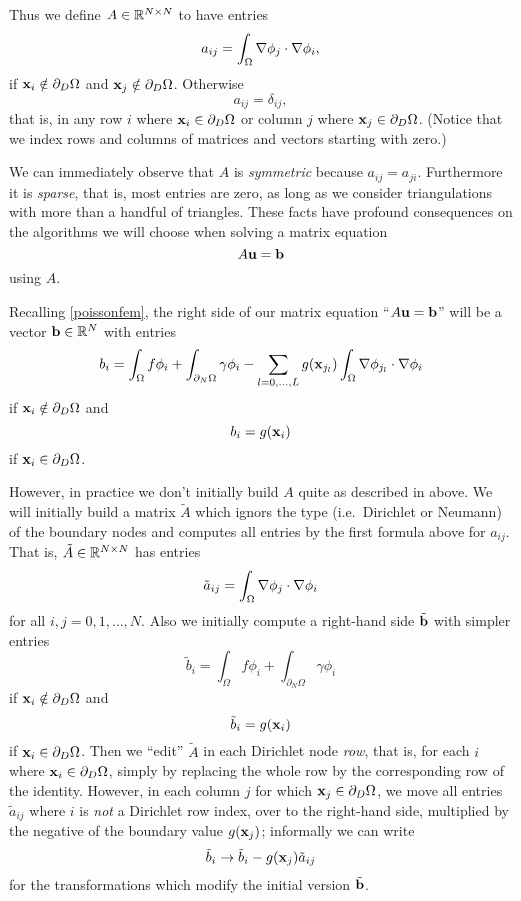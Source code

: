 Thus we define $A \in \mathbb{R}^{N\times N}$ to have entries
\begin{equation*}
a_{ij} = \int_\Omega \nabla \phi_j \cdot \nabla \phi_i,
\end{equation*}
if $\mathbf{x}_i \notin \partial_D \Omega$ and $\mathbf{x}_j \notin \partial_D \Omega$.  Otherwise
\begin{equation*}
a_{ij} = \delta_{ij},
\end{equation*}
that is, in any row $i$ where $\mathbf{x}_i \in \partial_D \Omega$ or column $j$ where $\mathbf{x}_j \in \partial_D \Omega$.  (Notice that we index rows and columns of matrices and vectors starting with zero.)

We can immediately observe that $A$ is \emph{symmetric} because $a_{ij}=a_{ji}$.  Furthermore it is \emph{sparse}, that is, most entries are zero, as long as we consider triangulations with more than a handful of triangles.  These facts have profound consequences on the algorithms we will choose when solving a matrix equation
\begin{equation}
A \mathbf{u} = \mathbf{b} \label{poissonmatrix}
\end{equation}
using $A$.

Recalling \eqref{poissonfem}, the right side of our matrix equation ``$A \mathbf{u} = \mathbf{b}$'' will be a vector $\mathbf{b}\in\mathbb{R}^N$ with entries
    $$b_i = \int_\Omega f \phi_i + \int_{\partial_N\Omega} \gamma \phi_i - \sum_{l=0,\dots,L} g(\mathbf{x}_{j_l})  \int_\Omega \nabla \phi_{j_l} \cdot \nabla \phi_i$$
if $\mathbf{x}_i \notin \partial_D \Omega$ and
    $$b_i = g(\mathbf{x}_{i})$$
if $\mathbf{x}_i \in \partial_D \Omega$.

However, in practice we don't initially build $A$ quite as described in above.  We will initially build a matrix $\tilde A$ which ignors the type (i.e.~Dirichlet or Neumann) of the boundary nodes and computes all entries by the first formula above for $a_{ij}$.  That is, $\tilde A \in \mathbb{R}^{N\times N}$ has entries
\begin{equation*}
\tilde a_{ij} = \int_\Omega \nabla \phi_j \cdot \nabla \phi_i
\end{equation*}
for all $i,j=0,1,\dots,N$.  Also we initially compute a right-hand side $\tilde {\mathbf{b}}$ with simpler entries
    $$\tilde b_i = \int_\Omega f \phi_i + \int_{\partial_N\Omega} \gamma \phi_i$$
if $\mathbf{x}_i \notin \partial_D \Omega$ and
    $$\tilde b_i = g(\mathbf{x}_{i})$$
if $\mathbf{x}_i \in \partial_D \Omega$.  Then we ``edit'' $\tilde A$ in each Dirichlet node \emph{row}, that is, for each $i$ where $\mathbf{x}_i \in \partial_D \Omega$, simply by replacing the whole row by the corresponding row of the identity.  However, in each column $j$ for which $\mathbf{x}_j \in \partial_D \Omega$, we move all entries $\tilde a_{ij}$ where $i$ is \emph{not} a Dirichlet row index, over to the right-hand side, multiplied by the negative of the boundary value $g(\mathbf{x}_{j})$; informally we can write
    $$\tilde b_i \to \tilde b_i - g(\mathbf{x}_{j}) \tilde a_{ij}$$
for the transformations which modify the initial version $\tilde {\mathbf{b}}$.

